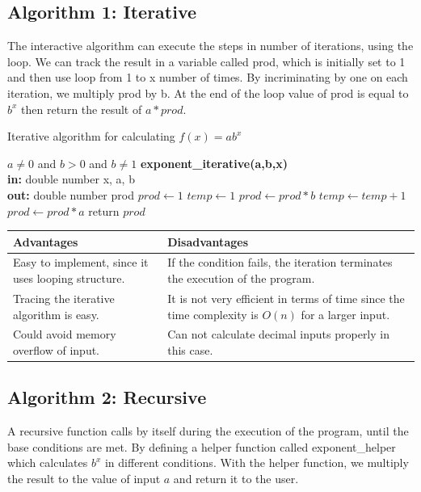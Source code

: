 \documentclass[11pt]{article}
\begin{document}
\subsection{Algorithm 1: Iterative}
The interactive algorithm can execute the steps in number of iterations, using the loop. We can track the result in a variable called prod, which is initially set to 1 and then use loop from 1 to x number of times. By incriminating by one on each iteration, we multiply prod by b. At the end of the loop value of prod is equal to $b^x$ then return the result of $a * prod$\cite{xu2015application}.

\begin{algorithm}
  \caption{Iterative algorithm for calculating $f(x) = ab^x$}
  \begin{algorithmic}[1]
  \Require $a \neq 0$ and $b > 0$ and $b \neq 1$ 
    \Function\textbf{\textbf{exponent\_iterative(a,b,x)}}\\
    \textbf{in: }double number x, a, b\\
    \textbf{out: }double number prod
    \State $prod \gets 1$
    \State $temp \gets 1$
        \qquad \State $prod \leftarrow prod*b$
        \qquad \State $temp \leftarrow temp+1$
    \EndFor
    \State $prod \gets prod*a$
    \State return $prod$
    \EndFunction
  \end{algorithmic}
\end{algorithm}

\begin{center}
\begin{tabular}{|p{7cm}|p{7cm}|}
\hline
     \textbf{Advantages} & \textbf{Disadvantages}\\ \hline
     Easy to implement, since it uses looping structure. & If the condition fails, the iteration terminates the execution of the program.\\ \hline
     Tracing the iterative algorithm is easy. & It is not very efficient in terms of time since the time complexity is $O(n)$ for a larger input\cite{xu2015application}. \\ \hline
     Could avoid memory overflow of input. & Can not calculate decimal inputs properly in this case.\\ \hline
\end{tabular}
\end{center}

\subsection{Algorithm 2: Recursive}
A recursive function calls by itself during the execution of the program, until the base conditions are met\cite{haberman2002case}. By defining a helper function called exponent\_helper which calculates $b^x$ in different conditions. With the helper function, we multiply the result to the value of input $a$ and return it to the user.
\end{document}
